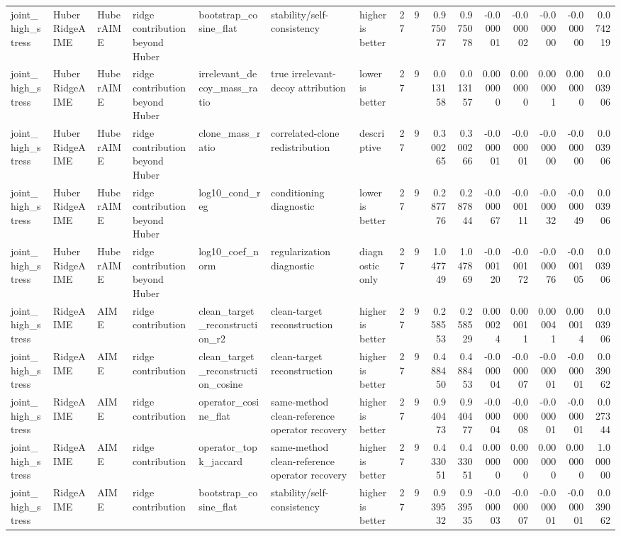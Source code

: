 \begin{table}[t]
\begin{tabular}{lllllllrrrrrrrrr}
joint_high_stress & HuberRidgeAIME & HuberAIME & ridge contribution beyond Huber & bootstrap_cosine_flat & stability/self-consistency & higher is better & 27 & 9 & 0.975077 & 0.975078 & -0.000001 & -0.000002 & -0.000000 & -0.000000 & 0.074219 \\
joint_high_stress & HuberRidgeAIME & HuberAIME & ridge contribution beyond Huber & irrelevant_decoy_mass_ratio & true irrelevant-decoy attribution & lower is better & 27 & 9 & 0.013158 & 0.013157 & 0.000000 & 0.000000 & 0.000001 & 0.000000 & 0.003906 \\
joint_high_stress & HuberRidgeAIME & HuberAIME & ridge contribution beyond Huber & clone_mass_ratio & correlated-clone redistribution & descriptive & 27 & 9 & 0.300265 & 0.300266 & -0.000001 & -0.000001 & -0.000000 & -0.000000 & 0.003906 \\
joint_high_stress & HuberRidgeAIME & HuberAIME & ridge contribution beyond Huber & log10_cond_reg & conditioning diagnostic & lower is better & 27 & 9 & 0.287776 & 0.287844 & -0.000067 & -0.000111 & -0.000032 & -0.000049 & 0.003906 \\
joint_high_stress & HuberRidgeAIME & HuberAIME & ridge contribution beyond Huber & log10_coef_norm & regularization diagnostic & diagnostic only & 27 & 9 & 1.047749 & 1.047869 & -0.000120 & -0.000172 & -0.000076 & -0.000105 & 0.003906 \\
joint_high_stress & RidgeAIME & AIME & ridge contribution & clean_target_reconstruction_r2 & clean-target reconstruction & higher is better & 27 & 9 & 0.258553 & 0.258529 & 0.000024 & 0.000011 & 0.000041 & 0.000014 & 0.003906 \\
joint_high_stress & RidgeAIME & AIME & ridge contribution & clean_target_reconstruction_cosine & clean-target reconstruction & higher is better & 27 & 9 & 0.488450 & 0.488453 & -0.000004 & -0.000007 & -0.000001 & -0.000001 & 0.039062 \\
joint_high_stress & RidgeAIME & AIME & ridge contribution & operator_cosine_flat & same-method clean-reference operator recovery & higher is better & 27 & 9 & 0.940473 & 0.940477 & -0.000004 & -0.000008 & -0.000001 & -0.000001 & 0.027344 \\
joint_high_stress & RidgeAIME & AIME & ridge contribution & operator_topk_jaccard & same-method clean-reference operator recovery & higher is better & 27 & 9 & 0.433051 & 0.433051 & 0.000000 & 0.000000 & 0.000000 & 0.000000 & 1.000000 \\
joint_high_stress & RidgeAIME & AIME & ridge contribution & bootstrap_cosine_flat & stability/self-consistency & higher is better & 27 & 9 & 0.939532 & 0.939535 & -0.000003 & -0.000007 & -0.000001 & -0.000001 & 0.039062 \\

\end{tabular}
\end{table}
